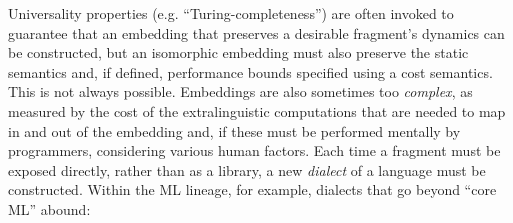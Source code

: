 \documentclass[10pt,preprint]{sigplanconf}
\begin{document}
Universality properties (e.g. ``Turing-completeness'') are often invoked to guarantee that an embedding that preserves a desirable fragment's dynamics can be constructed, but an isomorphic embedding must also preserve the static semantics and, if defined, performance bounds specified using a cost semantics. This is not always possible. 
Embeddings are also sometimes too \emph{complex}, as measured by the cost of the extralinguistic computations that are needed to map in and out of the embedding and, if these  must be performed mentally by programmers, considering various human factors. %
Each time a fragment must be exposed directly, rather than as a library, a new \emph{dialect} of a language must be constructed. Within the ML lineage, for example, dialects that go beyond ``core ML'' abound:
%
\end{document}
